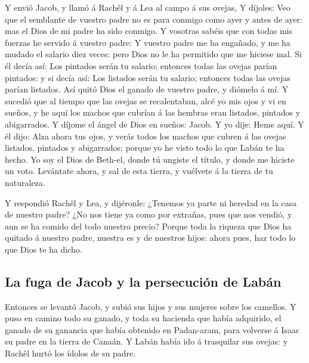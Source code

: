  Y envió Jacob, y llamó á Rachêl y á Lea al campo á sus
ovejas,  Y díjoles: Veo que el semblante de vuestro padre
no es para conmigo como ayer y antes de ayer: mas el Dios de mi padre ha
sido conmigo.  Y vosotras sabéis que con todas mis fuerzas
he servido á vuestro padre:  Y vuestro padre me ha
engañado, y me ha mudado el salario diez veces: pero Dios no le ha
permitido que me hiciese mal.  Si él decía así: Los
pintados serán tu salario; entonces todas las ovejas parían pintados: y
si decía así: Los listados serán tu salario; entonces todas las ovejas
parían listados.  Así quitó Dios el ganado de vuestro
padre, y diómelo á mí.  Y sucedió que al tiempo que las
ovejas se recalentaban, alcé yo mis ojos y vi en sueños, y he aquí los
machos que cubrían á las hembras eran listados, pintados y abigarrados.
 Y díjome el ángel de Dios en sueños: Jacob. Y yo dije:
Heme aquí.  Y él dijo: Alza ahora tus ojos, y verás todos
los machos que cubren á las ovejas listados, pintados y abigarrados;
porque yo he visto todo lo que Labán te ha hecho.  Yo soy
el Dios de Beth-el, donde tú ungiste el título, y donde me hiciste un
voto. Levántate ahora, y sal de esta tierra, y vuélvete á la tierra de
tu naturaleza.

 Y respondió Rachêl y Lea, y dijéronle: ¿Tenemos ya parte
ni heredad en la casa de nuestro padre?  ¿No nos tiene ya
como por extrañas, pues que nos vendió, y aun se ha comido del todo
nuestro precio?  Porque toda la riqueza que Dios ha
quitado á nuestro padre, nuestra es y de nuestros hijos: ahora pues, haz
todo lo que Dios te ha dicho.

\hypertarget{la-fuga-de-jacob-y-la-persecuciuxf3n-de-labuxe1n}{%
\subsection{La fuga de Jacob y la persecución de
Labán}\label{la-fuga-de-jacob-y-la-persecuciuxf3n-de-labuxe1n}}

 Entonces se levantó Jacob, y subió sus hijos y sus
mujeres sobre los camellos.  Y puso en camino todo su
ganado, y toda su hacienda que había adquirido, el ganado de su ganancia
que había obtenido en Padan-aram, para volverse á Isaac su padre en la
tierra de Canaán.  Y Labán había ido á trasquilar sus
ovejas: y Rachêl hurtó los ídolos de su padre.

